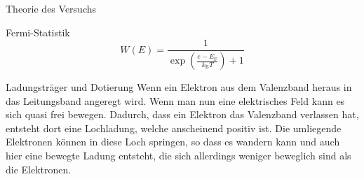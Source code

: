 \documentclass[pdftex, a4paper,11pt, twoside, ngerman]{report}
\begin{document}
\begin{chapter}{Theorie des Versuchs}
\begin{section}{Fermi-Statistik}
            \begin{equation}
                W(E) = \frac{1}{\exp({\frac{e-E_\text{F}}{k_\text{B}T}})+1}
            \end{equation}
            
        \end{section}

        \begin{section}{Ladungsträger und Dotierung}
            Wenn ein Elektron aus dem Valenzband heraus in das Leitungsband angeregt wird.
            Wenn man nun eine elektrisches Feld kann es sich quasi frei bewegen.
            Dadurch, dass ein Elektron das Valenzband verlassen hat, entsteht dort eine Lochladung, welche anscheinend positiv ist. 
            Die umliegende Elektronen können in diese Loch springen, so dass es wandern kann und auch hier eine bewegte Ladung entsteht, die sich allerdings weniger beweglich sind als die Elektronen.
            

\end{section}
\end{chapter}
\end{document}
